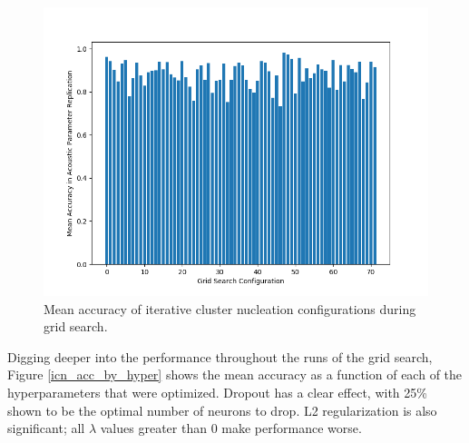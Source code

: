 \documentclass[10pt]{article}
\begin{document}
\begin{figure}[h]
    \centering
    \includegraphics[width=\textwidth]{icn_accuracy_by_run}
    \caption{\label{icn_accuracy_by_run} Mean accuracy of iterative cluster nucleation configurations during grid search.}
\end{figure}

Digging deeper into the performance throughout the runs of the grid search, Figure \ref{icn_acc_by_hyper} shows the mean accuracy as a function of each of the hyperparameters that were optimized. Dropout has a clear effect, with 25\% shown to be the optimal number of neurons to drop. L2 regularization is also significant; all $\lambda$ values greater than 0 make performance worse.
\end{document}
